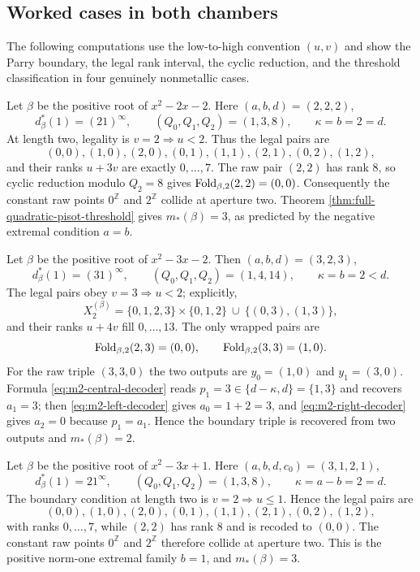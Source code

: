 \subsection{Worked cases in both chambers}

The following computations use the low-to-high convention $(u,v)$ and show
the Parry boundary, the legal rank interval, the cyclic reduction, and the
threshold classification in four genuinely nonmetallic cases.

\begin{example}
Let $\beta$ be the positive root of $x^2-2x-2$.  Here
$(a,b,d)=(2,2,2)$,
\[
d_\beta^*(1)=(21)^\infty,\qquad (Q_0,Q_1,Q_2)=(1,3,8),
\qquad \kappa=b=2=d.
\]
At length two, legality is $v=2\Rightarrow u<2$.  Thus the legal pairs are
\[
(0,0),(1,0),(2,0),(0,1),(1,1),(2,1),(0,2),(1,2),
\]
and their ranks $u+3v$ are exactly $0,\ldots,7$.  The raw pair $(2,2)$ has
rank $8$, so cyclic reduction modulo $Q_2=8$ gives
$\mathrm{Fold}_{\beta,2}(2,2)=(0,0)$.  Consequently the constant raw points
$0^{\mathbb Z}$ and $2^{\mathbb Z}$ collide at aperture two.  Theorem
\ref{thm:full-quadratic-pisot-threshold} gives $m_*(\beta)=3$, as predicted by
the negative extremal condition $a=b$.
\end{example}

\begin{example}
Let $\beta$ be the positive root of $x^2-3x-2$.  Then
$(a,b,d)=(3,2,3)$,
\[
d_\beta^*(1)=(31)^\infty,\qquad (Q_0,Q_1,Q_2)=(1,4,14),
\qquad \kappa=b=2<d.
\]
The legal pairs obey $v=3\Rightarrow u<2$; explicitly,
\[
X_2^{(\beta)}=\{0,1,2,3\}\times\{0,1,2\}
\ \cup\ \{(0,3),(1,3)\},
\]
and their ranks $u+4v$ fill $0,\ldots,13$.  The only wrapped pairs are
\[
\mathrm{Fold}_{\beta,2}(2,3)=(0,0),\qquad
\mathrm{Fold}_{\beta,2}(3,3)=(1,0).
\]
For the raw triple $(3,3,0)$ the two outputs are
$y_0=(1,0)$ and $y_1=(3,0)$.  Formula
\eqref{eq:m2-central-decoder} reads $p_1=3\in\{d-\kappa,d\}=\{1,3\}$ and
recovers $a_1=3$; then \eqref{eq:m2-left-decoder} gives
$a_0=1+2=3$, and \eqref{eq:m2-right-decoder} gives $a_2=0$ because
$p_1=a_1$.  Hence the boundary triple is recovered from two outputs and
$m_*(\beta)=2$.
\end{example}

\begin{example}
Let $\beta$ be the positive root of $x^2-3x+1$.  Here
$(a,b,d,c_0)=(3,1,2,1)$,
\[
d_\beta^*(1)=21^\infty,\qquad (Q_0,Q_1,Q_2)=(1,3,8),
\qquad \kappa=a-b=2=d.
\]
The boundary condition at length two is $v=2\Rightarrow u\le1$.  Hence the
legal pairs are
\[
(0,0),(1,0),(2,0),(0,1),(1,1),(2,1),(0,2),(1,2),
\]
with ranks $0,\ldots,7$, while $(2,2)$ has rank $8$ and is recoded to
$(0,0)$.  The constant raw points $0^{\mathbb Z}$ and
$2^{\mathbb Z}$ therefore collide at aperture two.  This is the positive
norm-one extremal family $b=1$, and $m_*(\beta)=3$.
\end{example}


